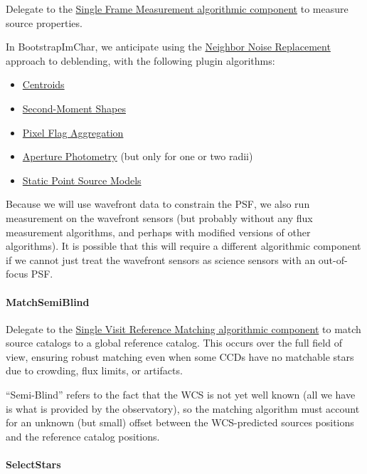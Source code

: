 Delegate to the \hyperref[sec:acSingleFrameMeasurement]{Single Frame Measurement algorithmic component} to measure source properties.

In BootstrapImChar, we anticipate using the \hyperref[sec:acReplaceNeighborsWithNoise]{Neighbor Noise Replacement} approach to deblending, with the following plugin algorithms:
\begin{itemize}
\item \hyperref[sec:acCentroidAlgorithms]{Centroids}
\item \hyperref[sec:acShapeAlgorithms]{Second-Moment Shapes}
\item \hyperref[sec:acPixelFlags]{Pixel Flag Aggregation}
\item \hyperref[sec:acAperturePhotometry]{Aperture Photometry} (but only for one or two radii)
\item \hyperref[sec:acStaticPointSourceModels]{Static Point Source Models}
\end{itemize}

Because we will use wavefront data to constrain the PSF, we also run measurement on the wavefront sensors (but probably without any flux measurement algorithms, and perhaps with modified versions of other algorithms).  It is possible that this will require a different algorithmic component if we cannot just treat the wavefront sensors as science sensors with an out-of-focus PSF.

\paragraph{MatchSemiBlind}
\label{sec:drpBootstrapImChar_MatchSemiBlind}

Delegate to the \hyperref[sec:acSingleVisitReferenceMatching]{Single Visit Reference Matching algorithmic component} to match source catalogs to a global reference catalog.  This occurs over the full field of view, ensuring robust matching even when some CCDs have no matchable stars due to crowding, flux limits, or artifacts.

``Semi-Blind'' refers to the fact that the WCS is not yet well known (all we have is what is provided by the observatory), so the matching algorithm must account for an unknown (but small) offset between the WCS-predicted sources positions and the reference catalog positions.

\paragraph{SelectStars}
\label{sec:drpBootstrapImChar_SelectStars}

